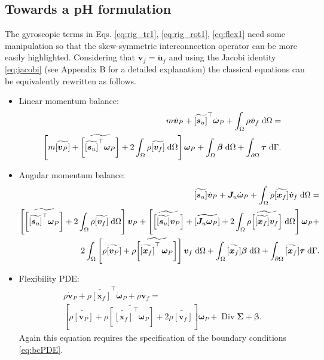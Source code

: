 \documentclass{svjour3}                     %
\DeclareMathOperator*{\Div}{Div}
\newcommand{\crmat}[1]{\ensuremath{\widetilde{\left[#1\right]}}}
\begin{document}
	\subsection{Towards a pH formulation}
	The gyroscopic terms in Eqs. \eqref{eq:rig_tr1}, \eqref{eq:rig_rot1}, \eqref{eq:flex1} need some manipulation so that the skew-symmetric interconnection operator can be more easily highlighted. Considering that $\dot{\bm{v}}_f = \ddot{\bm{u}}_f$ and using the Jacobi identity \eqref{eq:jacobi} (see Appendix B for a detailed explanation) the classical equations can be equivalently rewritten as follows. \\
	\begin{itemize}
		\item Linear momentum balance:
		\begin{equation}
		\label{eq:rig_tr2}
		\begin{split}
		m\dot{\bm{v}}_P + \crmat{\bm{s}_u}^\top \dot{\bm{\omega}}_P +   \int_{\Omega} \rho \dot{\bm{v}}_f \d{\Omega}  = \\
		\left[m \crmat{\bm{v}_P} + \crmat{\crmat{\bm{s}_u}^\top \bm\omega_P} +2 \int_{\Omega} \rho \crmat{\bm{v}_f} \d{\Omega}\right] \bm\omega_P +  \int_{\Omega} \bm\beta \d{\Omega} + \int_{\partial \Omega} \bm\tau \d{\Gamma}.
		\end{split}
		\end{equation}
		\item Angular momentum balance:
		\begin{equation}
		\label{eq:rig_rot2}
		\begin{split}
		\crmat{\bm{s}_u} \dot{\bm{v}}_P  + \bm{J}_u \dot{\bm\omega}_P + \int_{\Omega} \rho \crmat{\bm{x}_f} \dot{\bm{v}}_f \d{\Omega} = \\
		\left[\crmat{\crmat{\bm{s}_u}^\top \bm\omega_P} + 2 \int_{\Omega} \rho \crmat{\bm{v}_f} \d{\Omega}\right] \bm{v}_P + \left[\crmat{\crmat{\bm{s}_u} \bm{v}_P} + \crmat{\bm{J}_u \bm\omega_P} + 2 \int_{\Omega} \rho \crmat{\crmat{\bm{x}_f} {\bm{v}}_f} \d{\Omega}\right] \bm\omega_P + 
		\\
		2 \int_{\Omega} \left[\rho \crmat{\bm{v}_P} + \rho \crmat{\crmat{\bm{x}_f}^\top \, \bm\omega_P}\right] \bm{v}_f \d{\Omega} + \int_{\Omega}\crmat{\bm{x}_f} \bm\beta \d{\Omega} + \int_{\partial \Omega}\crmat{\bm{x}_f} \bm{\tau} \d{\Gamma}.
		\end{split}
		\end{equation}
		\item Flexibility PDE:
		\begin{equation}
		\label{eq:flex2}
		\begin{split}
		\rho \dot{\bm{v}}_P + \rho \crmat{\bm{x}_f}^\top \dot{\bm\omega}_P  + \rho \dot{\bm{v}}_f = \\
		\left[\rho \crmat{\bm{v}_P} + \rho \crmat{\crmat{\bm{x}_f}^\top \bm\omega_P} + 2 \rho \crmat{\bm{v}_f}\right] \bm\omega_P + \Div{\bm\Sigma} + \bm\beta.
		\end{split}
		\end{equation}
		Again this equation requires the specification of the boundary conditions \eqref{eq:bcPDE}.
	\end{itemize}
	
\end{document}
